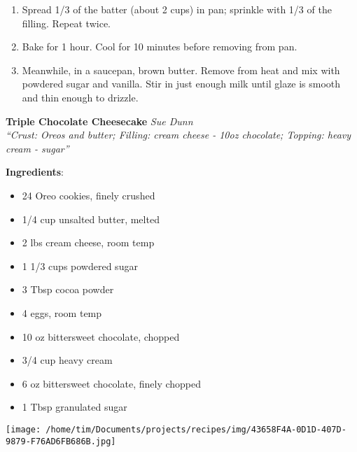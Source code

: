 \documentclass[11pt, twoside, openany]{book}
\begin{document}
\begin{minipage}[t]{\linewidth}
\begin{enumerate}
\item Spread 1/3 of the batter (about 2 cups) in pan; sprinkle with 1/3 of the filling. Repeat twice.
\item Bake for 1 hour. Cool for 10 minutes before removing from pan.
\item Meanwhile, in a saucepan, brown butter. Remove from heat and mix with powdered sugar and vanilla. Stir in just enough milk until glaze is smooth and thin enough to drizzle.
\end{enumerate}
\end{minipage}\vspace{8mm}
\noindent\begin{minipage}[t]{\linewidth}%
{\Large\textbf{Triple Chocolate Cheesecake}} \label{triple-chocolate-cheesecake}\hfill\textit{Sue Dunn}\\
\textit{``Crust: Oreos and butter; Filling: cream cheese - 10oz chocolate; Topping: heavy cream - sugar''}\\
\noindent\begin{minipage}[t]{0.78\linewidth}%
\textbf{Ingredients}:\vspace{-3mm}
\begin{multicols}{2}
\begin{itemize}\setlength\itemsep{-1mm}
\item 24 Oreo cookies, finely crushed
\item 1/4 cup unsalted butter, melted
\item 2 lbs cream cheese, room temp
\item 1 1/3 cups powdered sugar
\item 3 Tbsp cocoa powder
\item 4 eggs, room temp
\item 10 oz bittersweet chocolate, chopped
\item 3/4 cup heavy cream
\item 6 oz bittersweet chocolate, finely chopped
\item 1 Tbsp granulated sugar
\end{itemize}
\end{multicols}
\end{minipage}
\noindent\begin{minipage}[t]{0.18\linewidth}
\centering \strut\vspace*{-\baselineskip}\newline
\texttt{[image: /home/tim/Documents/projects/recipes/img/43658F4A-0D1D-407D-9879-F76AD6FB686B.jpg]}\\
\end{minipage}\vspace{3mm}

\end{minipage}
\end{document}
